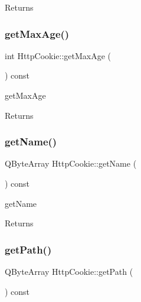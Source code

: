 \begin{DoxyReturn}{Returns}

\end{DoxyReturn}
\mbox{\label{class_http_cookie_a3a55c75cb4220b303cbed4713f538995}} 
\subsubsection{\texorpdfstring{get\+Max\+Age()}{getMaxAge()}}
{\footnotesize\ttfamily int Http\+Cookie\+::get\+Max\+Age (\begin{DoxyParamCaption}{ }\end{DoxyParamCaption}) const}



get\+Max\+Age 

\begin{DoxyReturn}{Returns}

\end{DoxyReturn}
\mbox{\label{class_http_cookie_abecd0373e90e3701e82bb4dc630c54a7}} 
\subsubsection{\texorpdfstring{get\+Name()}{getName()}}
{\footnotesize\ttfamily Q\+Byte\+Array Http\+Cookie\+::get\+Name (\begin{DoxyParamCaption}{ }\end{DoxyParamCaption}) const}



get\+Name 

\begin{DoxyReturn}{Returns}

\end{DoxyReturn}
\mbox{\label{class_http_cookie_a3796862a6c50124eb5c987dd617a097c}} 
\subsubsection{\texorpdfstring{get\+Path()}{getPath()}}
{\footnotesize\ttfamily Q\+Byte\+Array Http\+Cookie\+::get\+Path (\begin{DoxyParamCaption}{ }\end{DoxyParamCaption}) const}



